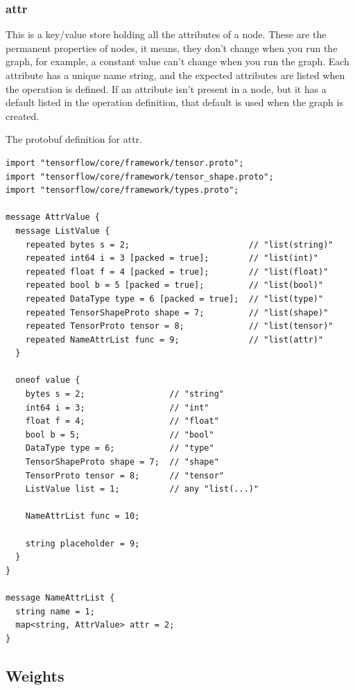 \documentclass[11pt,openany]{book}
\begin{document}
\subsubsection{attr}
This is a key/value store holding all the attributes of a node. These are the permanent properties of nodes, it means, they don't change when you run the graph, for example, a constant value can't change when you run the graph.
Each attribute has a unique name string, and the expected attributes are listed when the operation is defined. If an attribute isn't present in a node, but it has a default listed in the operation definition, that default is used when the graph is created.

The protobuf definition for attr.

\begin{verbatim}
import "tensorflow/core/framework/tensor.proto";
import "tensorflow/core/framework/tensor_shape.proto";
import "tensorflow/core/framework/types.proto";

message AttrValue {
  message ListValue {
    repeated bytes s = 2;                        // "list(string)"
    repeated int64 i = 3 [packed = true];        // "list(int)"
    repeated float f = 4 [packed = true];        // "list(float)"
    repeated bool b = 5 [packed = true];         // "list(bool)"
    repeated DataType type = 6 [packed = true];  // "list(type)"
    repeated TensorShapeProto shape = 7;         // "list(shape)"
    repeated TensorProto tensor = 8;             // "list(tensor)"
    repeated NameAttrList func = 9;              // "list(attr)"
  }

  oneof value {
    bytes s = 2;                 // "string"
    int64 i = 3;                 // "int"
    float f = 4;                 // "float"
    bool b = 5;                  // "bool"
    DataType type = 6;           // "type"
    TensorShapeProto shape = 7;  // "shape"
    TensorProto tensor = 8;      // "tensor"
    ListValue list = 1;          // any "list(...)"

    NameAttrList func = 10;

    string placeholder = 9;
  }
}

message NameAttrList {
  string name = 1;
  map<string, AttrValue> attr = 2;
}
\end{verbatim}

\subsection{Weights}
\end{document}
